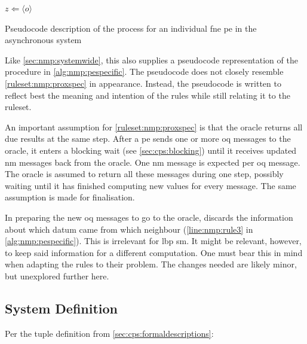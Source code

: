 \begin{algorithm}
{    \;
    
    \(z \Leftarrow \langle o \rangle\)\;
}
\caption[Pseudocode description of the process for an individual \gls{fne}  in the asynchronous system]{\label{alg:nmp:pespecific}Pseudocode description of the process for an individual \gls{fne} \gls{pe} in the asynchronous system}
\end{algorithm}

Like \cref{sec:nmp:systemwide}, this  also supplies a pseudocode representation of the procedure in \cref{alg:nmp:pespecific}.  The pseudocode does not closely resemble \cref{ruleset:nmp:proxspec} in appearance.  Instead, the pseudocode is written to reflect best the meaning and intention of the rules while still relating it to the \gls{ruleset}.

An important assumption for \cref{ruleset:nmp:proxspec} is that the oracle returns all due results at the same step.  After a \gls{pe} sends one or more \gls{oq} messages to the oracle, it enters a blocking wait (see \vref{sec:cps:blocking}) until it receives updated \gls{nm} messages back from the oracle.  One \gls{nm} message is expected per \gls{oq} message.  The oracle is assumed to return all these messages during one step, possibly waiting until it has finished computing new values for every message.  The same assumption is made for finalisation.

In preparing the new \gls{oq} messages to go to the oracle,  discards the information about which datum came from which neighbour (\cref{line:nmp:rule3} in \cref{alg:nmp:pespecific}).  This is irrelevant for \gls{lbp} \gls{sm}.  It might be relevant, however, to keep said information for a different computation.  One must bear this in mind when adapting the rules to their problem.  The changes needed are likely minor, but unexplored further here.

\subsection{System Definition}
Per the tuple definition from \cref{sec:cps:formaldescriptions}:


